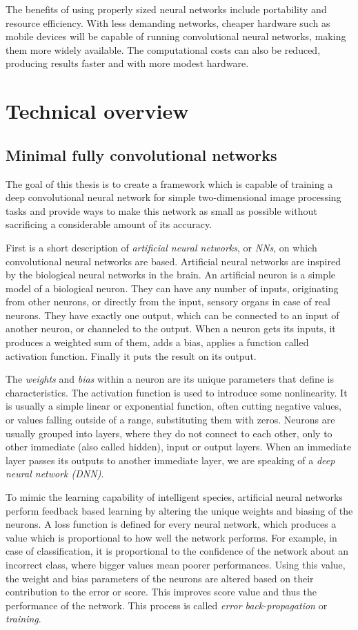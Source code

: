 \documentclass[12pt]{report}
\begin{document}
The benefits of using properly sized neural networks include portability and resource efficiency. With less demanding networks, cheaper hardware such as mobile devices will be capable of running convolutional neural networks, making them more widely available. The computational costs can also be reduced, producing results faster and with more modest hardware.
\chapter{Technical overview}
\section{Minimal fully convolutional networks}
The goal of this thesis is to create a framework which is capable of training a deep convolutional neural network for simple two-dimensional image processing tasks and provide ways to make this network as small as possible without sacrificing a considerable amount of its accuracy.

First is a short description of\textit{ artificial neural networks}, or \textit{NNs}, on which convolutional neural networks are based. Artificial neural networks are inspired by the biological neural networks in the brain. An artificial neuron is a simple model of a biological neuron. They can have any number of inputs, originating from other neurons, or directly from the input, sensory organs in case of real neurons. They have exactly one output, which can be connected to an input of another neuron, or channeled to the output. When a neuron gets its inputs, it produces a weighted sum of them, adds a bias, applies a function called activation function. Finally it puts the result on its output.

The \textit{weights} and \textit{bias} within a neuron are its unique parameters that define is characteristics. The activation function is used to introduce some nonlinearity. It is usually a simple linear or exponential function, often cutting negative values, or values falling outside of a range, substituting them with zeros. Neurons are usually grouped into layers, where they do not connect to each other, only to other immediate (also called hidden), input or output layers. When an immediate layer passes its outputs to another immediate layer, we are speaking of a \textit{deep neural network (DNN)}.

To mimic the learning capability of intelligent species, artificial neural networks perform feedback based learning by altering the unique weights and biasing of the neurons. A loss function is defined for every neural network, which produces a value which is proportional to how well the network performs. For example, in case of classification, it is proportional to the confidence of the network about an incorrect class, where bigger values mean poorer performances. Using this value, the weight and bias parameters of the neurons are altered based on their contribution to the error or score. This improves score value and thus the performance of the network. This process is called \textit{error back-propagation} or \textit{training}.
\end{document}
